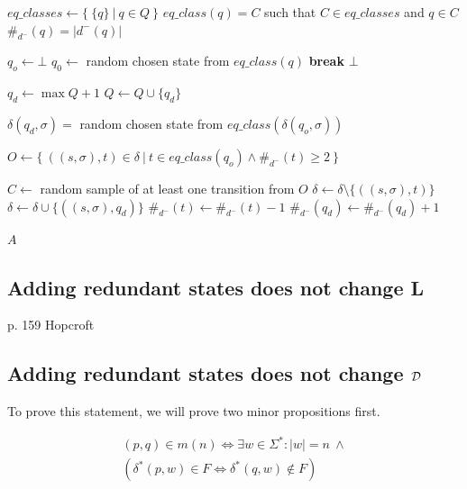 \vspace{0.2cm}
\begin{algorithmic}[1]
	\State $eq\_classes \gets \{\ \{q\}\ |\ q \in Q\ \}$
	\State $eq\_class(q) = C$ such that $C \in eq\_classes$ and $q \in C$
	\State $\#_{d^-}(q) = |d^-(q)|$
	\State
	
		\State
		\State $q_o \gets \bot$
				\State $q_0 \gets$ random chosen state from $eq\_class(q)$
				\State \textbf{break}
			\EndIf
		\EndFor
			\State \Return $\bot$
		\EndIf
		
		\State
		\State $q_d \gets \max Q + 1$
		\State $Q \gets Q \cup \{ q_d \}$
		
		\State
			\State $\delta(q_d, \sigma) =$ random chosen state from $eq\_class(\delta(q_o, \sigma))$
		\EndFor
		
		\State
		\State $O \gets \{\ ((s, \sigma), t) \in \delta\ |\ t \in eq\_class(q_o) \land \#_{d^-}(t) \geq 2\ \}$
		
		\State $C \gets$ random sample of at least one transition from $O$
			\State $\delta \gets \delta \setminus \{((s, \sigma), t)\}$
			\State $\delta \gets \delta \cup \{((s, \sigma), q_d)\}$
			\State $\#_{d^-}(t) \gets \#_{d^-}(t) - 1$
			\State $\#_{d^-}(q_d) \gets \#_{d^-}(q_d) + 1$
		\EndFor
	\EndFor
	
	\State \Return $A$
	\EndFunction
\end{algorithmic}
\vspace{0.2cm}

\subsection{Adding redundant states does not change L}

p. 159 Hopcroft

\subsection{Adding redundant states does not change $\mathcal{D}$}

To prove this statement, we will prove two minor propositions first.

\begin{lemma}[Semantics of $(p,q) \in m(n)$] \label{ch:3:semantics-of-m(n)}
	\begin{multline*}
	(p,q) \in m(n) \Longleftrightarrow 
	\exists w\in\Sigma^*\colon |w| = n\ \land \\
	(\delta^*(p,w) \in F \Leftrightarrow \delta^*(q,w) \notin F)
	\end{multline*}
\end{lemma}

